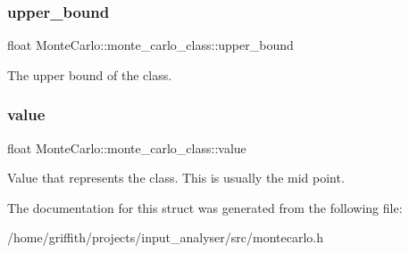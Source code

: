 \subsubsection{\texorpdfstring{upper\+\_\+bound}{upper\_bound}}
{\footnotesize\ttfamily float Monte\+Carlo\+::monte\+\_\+carlo\+\_\+class\+::upper\+\_\+bound}

The upper bound of the class. \mbox{\label{structMonteCarlo_1_1monte__carlo__class_a0c7e4c55c0c50edb28b278f25505d08a}} 
\subsubsection{\texorpdfstring{value}{value}}
{\footnotesize\ttfamily float Monte\+Carlo\+::monte\+\_\+carlo\+\_\+class\+::value}

Value that represents the class. This is usually the mid point. 

The documentation for this struct was generated from the following file\+:\begin{DoxyCompactItemize}
\item 
/home/griffith/projects/input\+\_\+analyser/src/montecarlo.\+h\end{DoxyCompactItemize}
